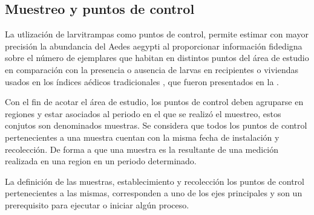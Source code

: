 \subsection{Muestreo y puntos de control}
La utlización de larvitrampas como puntos de control, permite estimar con mayor precisión la
abundancia del Aedes aegypti al proporcionar información fidedigna sobre el número de ejemplares
que habitan en distintos puntos del área de estudio en comparación con la presencia o ausencia de
larvas en recipientes o viviendas usados en los índices aédicos tradicionales
\citet{NINO2011}, que fueron presentados en la .

Con el fin de acotar el área de estudio, los puntos de control deben agruparse en regiones y estar
asociados al periodo en el que se realizó el muestreo, estos conjutos son denominados muestras. Se
considera que todos los puntos de control pertenecientes a una muestra cuentan con la misma fecha
de instalación y recolección. De forma a que una muestra es la resultante de una medición realizada
en una region en un periodo determinado.

La definición de las muestras, establecimiento y recolección los puntos de control pertenecientes
a las mismas, corresponden a uno de los ejes principales y son un prerequisito para ejecutar o
iniciar algún proceso.
